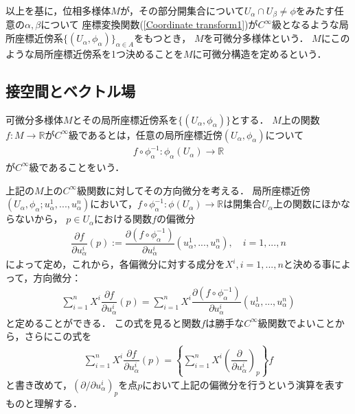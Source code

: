 \documentclass[dvipdfmx, a4paper,10pt]{jsarticle}
\theoremstyle{definition}
\newcommand{\eq}[1]{\begin{align}#1\end{align}}
\begin{document}
以上を基に，位相多様体$M$が，その部分開集合について$U_\alpha\cap U_\beta\neq\phi$をみたす任意の$\alpha,\beta$について
座標変換関数(\ref{Coordinate transform1})が$C^\infty$級となるような局所座標近傍系$\{(U_\alpha,\phi_\alpha)\}_{\alpha\in A}$をもつとき，
$M$を可微分多様体という．
$M$にこのような局所座標近傍系を1つ決めることを$M$に可微分構造を定めるという．
%
%
\subsection{接空間とベクトル場}
可微分多様体$M$とその局所座標近傍系を$\{(U_\alpha,\phi_\alpha)\}$とする．
$M$上の関数$f:M\rightarrow\mathbb{R}$が$C^\infty$級であるとは，任意の局所座標近傍$(U_\alpha,\phi_\alpha)$について
\eq{f\circ\phi_\alpha^{-1}:\phi_\alpha(U_\alpha)\rightarrow\mathbb{R}}
が$C^\infty$級であることをいう．

上記の$M$上の$C^\infty$級関数に対してその方向微分を考える．
局所座標近傍$(U_\alpha,\phi_\alpha;u^1_\alpha,...,u^n_\alpha)$において，$f\circ\phi^{-1}_\alpha:\phi(U_\alpha)\rightarrow\mathbb{R}$は開集合$U_\alpha$上の関数にほかならないから，
$p\in U_\alpha$における関数$f$の偏微分
\eq{\dfrac{\partial f}{\partial u^i_\alpha}(p):=\dfrac{\partial\left(f\circ\phi^{-1}_\alpha\right)}{\partial u^i_\alpha}(u^1_\alpha,...,u^n_\alpha), \quad i=1,...,n}
によって定め，これから，各偏微分に対する成分を$X^i,i=1,...,n$と決める事によって，方向微分：
\eq{\sum_{i=1}^nX^i\dfrac{\partial f}{\partial u^i_\alpha}(p)=\sum_{i=1}^nX^i\dfrac{\partial\left(f\circ\phi^{-1}_\alpha\right)}{\partial u^i_\alpha}(u^1_\alpha,...,u^n_\alpha)}
と定めることができる．
この式を見ると関数$f$は勝手な$C^\infty$級関数でよいことから，さらにこの式を
\eq{\sum_{i=1}^nX^i\dfrac{\partial f}{\partial u^i_\alpha}(p)=\left\{\sum_{i=1}^nX^i\left(\dfrac{\partial}{\partial u^i_\alpha}\right)_p\right\}f}
と書き改めて，$(\partial/\partial u^i_\alpha)_p$を点$p$において上記の偏微分を行うという演算を表すものと理解する．
\end{document}
